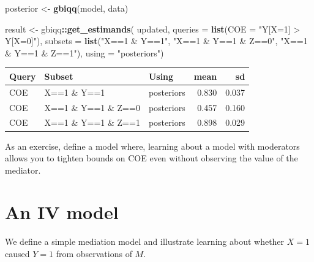 \documentclass[12pt,]{book}
\newenvironment{Shaded}{\begin{snugshade}}{\end{snugshade}}
\newcommand{\DataTypeTok}[1]{\textcolor[rgb]{0.13,0.29,0.53}{#1}}
\newcommand{\KeywordTok}[1]{\textcolor[rgb]{0.13,0.29,0.53}{\textbf{#1}}}
\newcommand{\NormalTok}[1]{#1}
\newcommand{\OperatorTok}[1]{\textcolor[rgb]{0.81,0.36,0.00}{\textbf{#1}}}
\newcommand{\StringTok}[1]{\textcolor[rgb]{0.31,0.60,0.02}{#1}}
\begin{document}
\begin{Shaded}
\begin{Highlighting}[]
\NormalTok{posterior <-}\StringTok{ }\KeywordTok{gbiqq}\NormalTok{(model, data)}
\end{Highlighting}
\end{Shaded}

\begin{Shaded}
\begin{Highlighting}[]
\NormalTok{result <-}\StringTok{ }\NormalTok{gbiqq}\OperatorTok{::}\KeywordTok{get_estimands}\NormalTok{(}
\NormalTok{    updated, }
    \DataTypeTok{queries =} \KeywordTok{list}\NormalTok{(}\DataTypeTok{COE =} \StringTok{"Y[X=1] > Y[X=0]"}\NormalTok{), }
    \DataTypeTok{subsets =} \KeywordTok{list}\NormalTok{(}\StringTok{"X==1 & Y==1"}\NormalTok{, }\StringTok{"X==1 & Y==1 & Z==0"}\NormalTok{, }\StringTok{"X==1 & Y==1 & Z==1"}\NormalTok{),}
    \DataTypeTok{using =} \StringTok{"posteriors"}\NormalTok{)}
\end{Highlighting}
\end{Shaded}

\begin{tabular}{l|l|l|r|r}
\hline
Query & Subset & Using & mean & sd\\
\hline
COE & X==1 \& Y==1 & posteriors & 0.830 & 0.037\\
\hline
COE & X==1 \& Y==1 \& Z==0 & posteriors & 0.457 & 0.160\\
\hline
COE & X==1 \& Y==1 \& Z==1 & posteriors & 0.898 & 0.029\\
\hline
\end{tabular}

As an exercise, define a model where, learning about a model with moderators allows you to tighten bounds on COE even without observing the value of the mediator.

\hypertarget{an-iv-model}{%
\section{An IV model}\label{an-iv-model}}

We define a simple mediation model and illustrate learning about whether \(X=1\) caused \(Y=1\) from observations of \(M\).

\begin{Shaded}
\end{Shaded}
\end{document}
